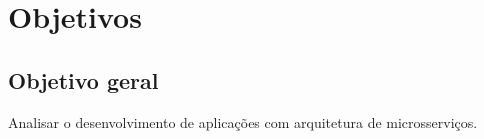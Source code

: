 



\section{Objetivos}\label{sec-objetivos}


\subsection{Objetivo geral}\label{sec-objetivo-geral}

Analisar o desenvolvimento de aplicações com arquitetura de microsserviços.

